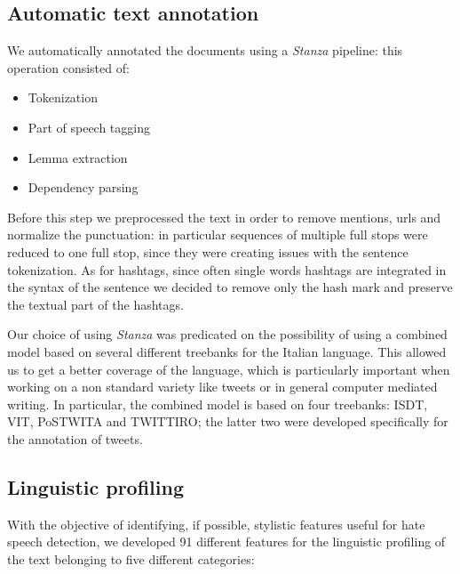 \subsection{Automatic text annotation}
We automatically annotated the documents using a \emph{Stanza} \cite{stanza} pipeline: this operation consisted of:
\begin{itemize}
    \item Tokenization
    \item Part of speech tagging
    \item Lemma extraction
    \item Dependency parsing
\end{itemize}

Before this step we preprocessed the text in order to remove mentions, urls and normalize the punctuation: in particular sequences of multiple full stops were reduced to one full stop, since they were creating issues with the sentence tokenization.
As for hashtags, since often single words hashtags are integrated in the syntax of the sentence we decided to remove only the hash mark and preserve the textual part of the hashtags.

Our choice of using \emph{Stanza} was predicated on the possibility of using a combined model based on several different treebanks for the Italian language.
This allowed us to get a better coverage of the language, which is particularly important when working on a non standard variety like tweets or in general computer mediated writing.
In particular, the combined model is based on four treebanks: ISDT, VIT, PoSTWITA and TWITTIRO; the latter two were developed specifically for the annotation of tweets.

\subsection{Linguistic profiling}
With the objective of identifying, if possible, stylistic features useful for hate speech detection, we developed 91 different features for the linguistic profiling of the text belonging to five different categories:

